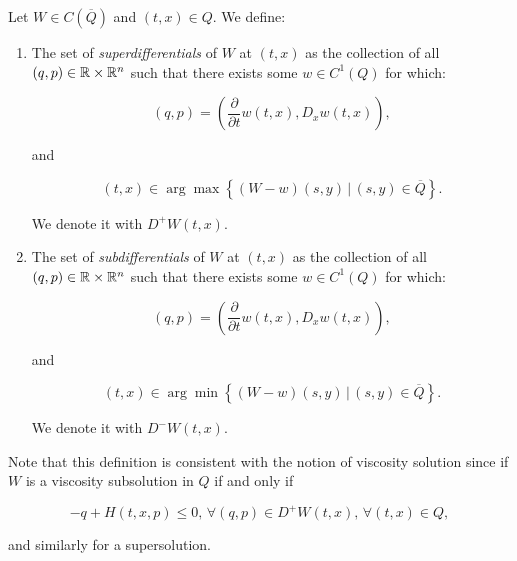 \begin{definition}
    Let $W\in C(\overline{Q})$ and $(t,x)\in Q$. We define:

    \begin{enumerate}
        \item The set of \textit{superdifferentials} of $W$ at $(t,x)$ as the collection of all $(q,p)\in\mathbb{R}\times\mathbb{R}^n$ such that 
        there exists some $w\in C^1(Q)$ for which:
        
        \begin{equation}
            (q,p) = \left(\frac{\partial}{\partial t}w(t,x),D_x w(t,x)\right),
        \end{equation}

        and

        \begin{equation}
            (t,x) \in \arg \max \left\{(W-w)(s,y)\,|\,(s,y)\in\overline{Q}\right\}.
        \end{equation}

        We denote it with $D^+W(t,x)$.

        \item The set of \textit{subdifferentials} of $W$ at $(t,x)$ as the collection of all $(q,p)\in\mathbb{R}\times\mathbb{R}^n$ such that 
        there exists some $w\in C^1(Q)$ for which:
        
        \begin{equation}
            (q,p) = \left(\frac{\partial}{\partial t}w(t,x),D_x w(t,x)\right),
        \end{equation}

        and

        \begin{equation}
            (t,x) \in \arg \min \left\{(W-w)(s,y)\,|\,(s,y)\in\overline{Q}\right\}.
        \end{equation}

        We denote it with $D^-W(t,x)$.
    \end{enumerate}
\end{definition}

Note that this definition is consistent with the notion of viscosity solution since if $W$ is a viscosity subsolution in $Q$ 
if and only if 

\[-q+H(t,x,p)\leq 0,\,\forall (q,p)\in D^+W(t,x),\,\forall(t,x)\in Q,\]

and similarly for a supersolution. 

